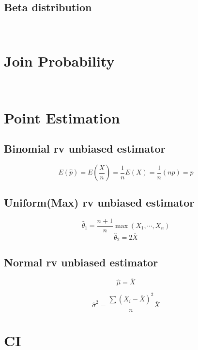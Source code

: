 \documentclass[UTF8]{ctexart}
\numberwithin{equation}{subsection}%
\begin{document}
	\subsection{Beta distribution}
	~\\
	\section{Join Probability}
	~\\
	\section{Point Estimation}
	\subsection{Binomial rv unbiased estimator}
	\begin{Large}
		\begin{equation}
			E(\hat{p})=E(\frac{X}{n})=\frac{1}{n}E(X)=\frac{1}{n}(np)=p
		\end{equation}		
	\end{Large}
	\subsection{Uniform(Max) rv unbiased estimator}
	\begin{Large}
		\begin{equation}
			\hat{\theta}_1=\frac{n+1}{n}\max(X_1,\cdots,X_n)
		\end{equation}	
		\begin{equation}
			\hat{\theta}_2=2\overline{X}
		\end{equation}	
    \end{Large}	
	\subsection{Normal rv unbiased estimator}
	\begin{Large}
		\begin{equation}
			\hat{\mu} = \overline{X}
		\end{equation}		
	\end{Large}
	\begin{Large}
		\begin{equation}
			\hat{\sigma}^2 = \frac{\sum(X_i-\overline{X})^2}{n}\overline{X}
		\end{equation}		
	\end{Large}
	\section{CI}
\end{document}
